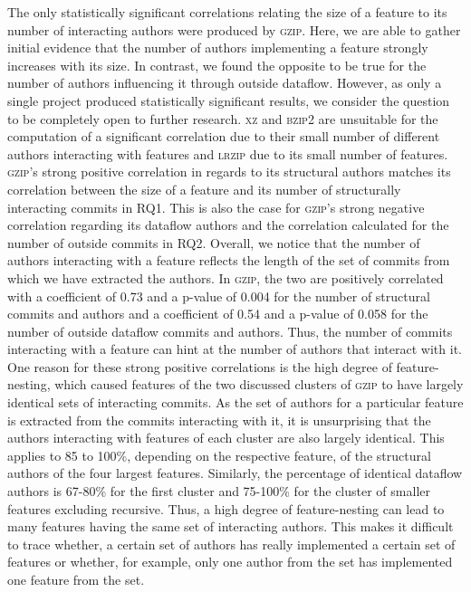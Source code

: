 The only statistically significant correlations relating the size of a feature to its number of interacting authors were produced by \textsc{gzip}.
Here, we are able to gather initial evidence that the number of authors implementing a feature strongly increases with its size.  
In contrast, we found the opposite to be true for the number of authors influencing it through outside dataflow. 
However, as only a single project produced statistically significant results, we consider the question to be completely open to further research. 
\textsc{xz} and \textsc{bzip2} are unsuitable for the computation of a significant correlation due to their small number of different authors interacting with features and \textsc{lrzip} due to its small number of features. \\
\textsc{gzip}'s strong positive correlation in regards to its structural authors matches its correlation between the size of a feature and its number of structurally interacting commits in RQ1.
This is also the case for \textsc{gzip}'s strong negative correlation regarding its dataflow authors and the correlation calculated for the number of outside commits in RQ2.
Overall, we notice that the number of authors interacting with a feature reflects the length of the set of commits from which we have extracted the authors.
In \textsc{gzip}, the two are positively correlated with a coefficient of 0.73 and a p-value of 0.004 for the number of structural commits and authors and a coefficient of 0.54 and a p-value of 0.058 for the number of outside dataflow commits and authors.
Thus, the number of commits interacting with a feature can hint at the number of authors that interact with it.
One reason for these strong positive correlations is the high degree of feature-nesting, which caused features of the two discussed clusters of \textsc{gzip} to have largely identical sets of interacting commits.
As the set of authors for a particular feature is extracted from the commits interacting with it, it is unsurprising that the authors interacting with features of each cluster are also largely identical.
This applies to 85 to 100\%, depending on the respective feature, of the structural authors of the four largest features. 
Similarly, the percentage of identical dataflow authors is 67-80\% for the first cluster and 75-100\% for the cluster of smaller features excluding \textsf{recursive}.
Thus, a high degree of feature-nesting can lead to many features having the same set of interacting authors.
This makes it difficult to trace whether, a certain set of authors has really implemented a certain set of features or whether, for example, only one author from the set has implemented one feature from the set. 

